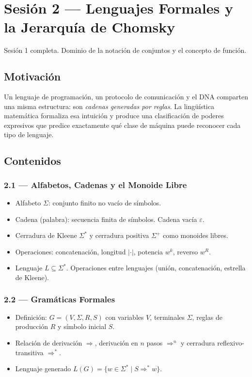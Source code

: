 \documentclass[11pt, letterpaper]{article}
\begin{document}
\newpage

\section{Sesión 2 — Lenguajes Formales y la Jerarquía de Chomsky}

\begin{prereqs}
Sesión 1 completa. Dominio de la notación de conjuntos y el concepto de función.
\end{prereqs}

\subsection*{Motivación}
Un lenguaje de programación, un protocolo de comunicación y el DNA comparten una misma estructura: son \emph{cadenas generadas por reglas}. La lingüística matemática formaliza esa intuición y produce una clasificación de poderes expresivos que predice exactamente qué clase de máquina puede reconocer cada tipo de lenguaje.

\subsection{Contenidos}

\subsubsection{2.1 — Alfabetos, Cadenas y el Monoide Libre}
\begin{itemize}
  \item Alfabeto $\Sigma$: conjunto finito no vacío de símbolos.
  \item Cadena (palabra): secuencia finita de símbolos. Cadena vacía $\varepsilon$.
  \item Cerradura de Kleene $\Sigma^*$ y cerradura positiva $\Sigma^+$ como monoides libres.
  \item Operaciones: concatenación, longitud $|\cdot|$, potencia $w^k$, reverso $w^R$.
  \item Lenguaje $L\subseteq\Sigma^*$. Operaciones entre lenguajes (unión, concatenación, estrella de Kleene).
\end{itemize}

\subsubsection{2.2 — Gramáticas Formales}
\begin{itemize}
  \item Definición: $G=(V,\Sigma,R,S)$ con variables $V$, terminales $\Sigma$, reglas de producción $R$ y símbolo inicial $S$.
  \item Relación de derivación $\Rightarrow$, derivación en $n$ pasos $\Rightarrow^n$ y cerradura reflexivo-transitiva $\Rightarrow^*$.
  \item Lenguaje generado $L(G)=\{w\in\Sigma^*\mid S\Rightarrow^* w\}$.
\end{itemize}
\end{document}
